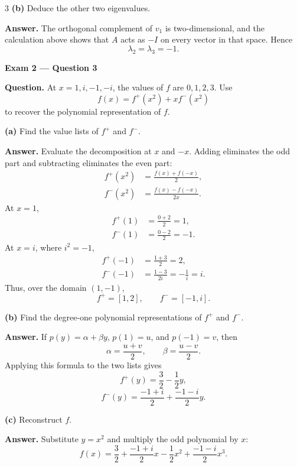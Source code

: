 \documentclass[10pt]{article}
\newcommand{\examlabel}[1]{%
  \par\noindent\textbf{#1}\par\vspace{1pt}}
\newcommand{\question}[1]{\par\noindent\textbf{Question.} #1\par}
\newcommand{\answer}{\par\noindent\textbf{Answer.} }
\begin{document}
\begin{multicols*}{3}
\textbf{(b)} Deduce the other two eigenvalues.

\answer The orthogonal complement of $v_1$ is two-dimensional, and the
calculation above shows that $A$ acts as $-I$ on every vector in that
space. Hence
\[
  \boxed{\lambda_2=\lambda_3=-1}.
\]

\examlabel{Exam 2 --- Question 3}
\question{At $x=1,i,-1,-i$, the values of $f$ are $0,1,2,3$.
Use
\[
  f(x)=f^+(x^2)+x f^-(x^2)
\]
to recover the polynomial representation of $f$.}

\textbf{(a)} Find the value lists of $f^+$ and $f^-$.

\answer Evaluate the decomposition at $x$ and $-x$. Adding eliminates the
odd part and subtracting eliminates the even part:
\[
  \begin{aligned}
  f^+(x^2)&=\frac{f(x)+f(-x)}2,\\
  f^-(x^2)&=\frac{f(x)-f(-x)}{2x}.
  \end{aligned}
\]
At $x=1$,
\[
  \begin{aligned}
  f^+(1)&=\frac{0+2}{2}=1,\\
  f^-(1)&=\frac{0-2}{2}=-1.
  \end{aligned}
\]
At $x=i$, where $i^2=-1$,
\[
  \begin{aligned}
  f^+(-1)&=\frac{1+3}{2}=2,\\
  f^-(-1)&=\frac{1-3}{2i}=-\frac1i=i.
  \end{aligned}
\]
Thus, over the domain $(1,-1)$,
\[
  \boxed{f^+=[1,2]},
  \qquad
  \boxed{f^-=[-1,i]}.
\]

\textbf{(b)} Find the degree-one polynomial representations of $f^+$ and
$f^-$.

\answer If $p(y)=\alpha+\beta y$, $p(1)=u$, and $p(-1)=v$, then
\[
  \alpha=\frac{u+v}{2},
  \qquad
  \beta=\frac{u-v}{2}.
\]
Applying this formula to the two lists gives
\[
  f^+(y)=\frac32-\frac12y,
\]
\[
  f^-(y)=\frac{-1+i}{2}+\frac{-1-i}{2}y.
\]

\textbf{(c)} Reconstruct $f$.

\answer Substitute $y=x^2$ and multiply the odd polynomial by $x$:
\[
\boxed{
  f(x)=\frac32+\frac{-1+i}{2}x-\frac12x^2
       +\frac{-1-i}{2}x^3}.
\]

\end{multicols*}
\newpage
\end{document}
